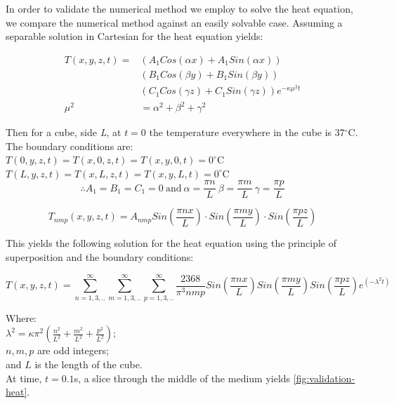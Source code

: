 In order to validate the numerical method we employ to solve the heat equation, we compare the numerical method against an easily solvable case.
Assuming a separable solution in Cartesian for the heat equation yields:

\begin{align*}
T(x,y,z,t)=&(A_1Cos(\alpha x) + A_1Sin(\alpha x))\\
&(B_1Cos(\beta y) + B_1Sin(\beta y))\\
&(C_1Cos(\gamma z) + C_1Sin(\gamma z))e^{-\kappa\mu^2t}\\
\mu^2&=\alpha^2+\beta^2+\gamma^2
\end{align*} 


Then for a cube, side \textit{L}, at $t=0$ the temperature everywhere in the cube is 37$^{\circ}$C. The boundary conditions are:\\

\noindent$T(0,y,z,t)=T(x,0,z,t)=T(x,y,0,t)=0^{\circ}$C\\
$T(L,y,z,t)=T(x,L,z,t)=T(x,y,L,t)=0^{\circ}$C\\

\begin{equation}
\therefore A_1=B_1=C_1=0\
\text{and}\ \alpha=\frac{\pi n}{L}\ \beta=\frac{\pi m}{L}\ \gamma=\frac{\pi p}{L}
\end{equation}

\begin{equation}
T_{nmp}(x,y,z,t)=A_{nmp}Sin\left(\frac{\pi n x}{L}\right)\cdot Sin\left(\frac{\pi m y}{L}\right)\cdot Sin\left(\frac{\pi p z}{L}\right)
\end{equation}

This yields the following solution for the heat equation using the principle of superposition and the boundary conditions:

\begin{equation}
T(x,y,z,t)=\sum^\infty_{n=1,3,..}\sum^\infty_{m=1,3,..}\sum^\infty_{p=1,3,..}\frac{2368}{\pi^3nmp}Sin(\frac{\pi n x}{L})Sin(\frac{\pi m y}{L})Sin(\frac{\pi p z}{L})e^{(-\lambda^2t)}
\end{equation}

\noindent Where:\\
	\indent $\lambda^2=\kappa\pi^2(\tfrac{n^2}{L^2}+\tfrac{m^2}{L^2}+\tfrac{p^2}{L^2})$;\\
	\indent $n,m,p$ are odd integers;\\
	\indent and $L$ is the length of the cube.\\
	
At time, $t=0.1$s, a slice through the middle of the medium yields \cref{fig:validation-heat}.

